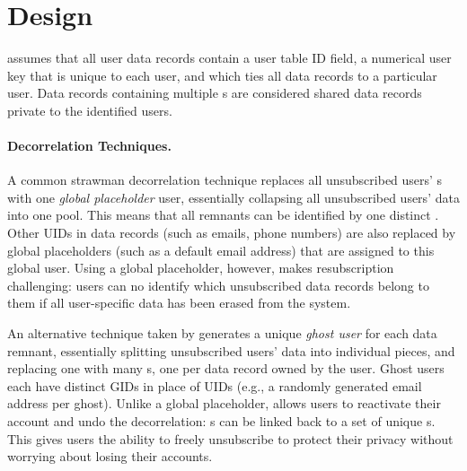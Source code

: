 \section{Design}
\iffalse
\sys{} assumes that all user data records contain a user table ID field, a
numerical user key \uidkey{} that is unique to each user, and which ties all data records
to a particular user.
Data records containing multiple \uidkey{}s are
considered shared data records private to the identified users. 

\paragraph{Decorrelation Techniques.}
A common strawman decorrelation technique replaces all unsubscribed users' \uidkey{}s with
one \emph{global placeholder} user, essentially collapsing all unsubscribed users' data into one pool.
This means that all remnants can be identified by one distinct \gidkey{}.
Other UIDs in data records (such as emails, phone numbers) are also replaced by global placeholders
(such as a default email address) that are assigned to this global user.
Using a global placeholder, however, makes resubscription challenging: users can no identify which unsubscribed data records belong to them if all user-specific data has been erased from the
system. 

An alternative technique taken by \sys{} generates a unique \emph{ghost user} for each data remnant,
essentially splitting unsubscribed users' data into individual pieces, and replacing one \uidkey{}
with many \gidkey{}s, one per data record owned by the user. Ghost users each have distinct GIDs in
place of UIDs (e.g., a randomly generated email address per ghost).  Unlike a global placeholder,
\sys{} allows users to reactivate their account and undo the decorrelation: \uidkey{}s can be linked
back to a set of unique \gidkey{}s.  This gives users the ability to freely unsubscribe to protect
their privacy without worrying about losing their accounts.   

%

